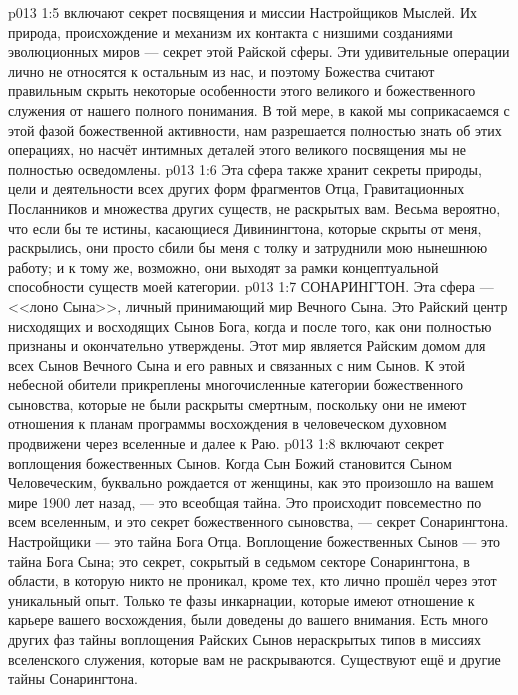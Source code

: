 \vs p013 1:5 \pc {} включают секрет посвящения и миссии Настройщиков Мыслей. Их природа, происхождение и механизм их контакта с низшими созданиями эволюционных миров --- секрет этой Райской сферы. Эти удивительные операции лично не относятся к остальным из нас, и поэтому Божества считают правильным скрыть некоторые особенности этого великого и божественного служения от нашего полного понимания. В той мере, в какой мы соприкасаемся с этой фазой божественной активности, нам разрешается полностью знать об этих операциях, но насчёт интимных деталей этого великого посвящения мы не полностью осведомлены.
\vs p013 1:6 Эта сфера также хранит секреты природы, цели и деятельности всех других форм фрагментов Отца, Гравитационных Посланников и множества других существ, не раскрытых вам. Весьма вероятно, что если бы те истины, касающиеся Дивинингтона, которые скрыты от меня, раскрылись, они просто сбили бы меня с толку и затруднили мою нынешнюю работу; и к тому же, возможно, они выходят за рамки концептуальной способности существ моей категории.
\vs p013 1:7 СОНАРИНГТОН. Эта сфера --- <<лоно Сына>>, личный принимающий мир Вечного Сына. Это Райский центр нисходящих и восходящих Сынов Бога, когда и после того, как они полностью признаны и окончательно утверждены. Этот мир является Райским домом для всех Сынов Вечного Сына и его равных и связанных с ним Сынов. К этой небесной обители прикреплены многочисленные категории божественного сыновства, которые не были раскрыты смертным, поскольку они не имеют отношения к планам программы восхождения в человеческом духовном продвижени через вселенные и далее к Раю.
\vs p013 1:8 \pc {} включают секрет воплощения божественных Сынов. Когда Сын Божий становится Сыном Человеческим, буквально рождается от женщины, как это произошло на вашем мире 1900 лет назад, --- это всеобщая тайна. Это происходит повсеместно по всем вселенным, и это секрет божественного сыновства, --- секрет Сонарингтона. Настройщики --- это тайна Бога Отца. Воплощение божественных Сынов --- это тайна Бога Сына; это секрет, сокрытый в седьмом секторе Сонарингтона, в области, в которую никто не проникал, кроме тех, кто лично прошёл через этот уникальный опыт. Только те фазы инкарнации, которые имеют отношение к карьере вашего восхождения, были доведены до вашего внимания. Есть много других фаз тайны воплощения Райских Сынов нераскрытых типов в миссиях вселенского служения, которые вам не раскрываются. Существуют ещё и другие тайны Сонарингтона.
